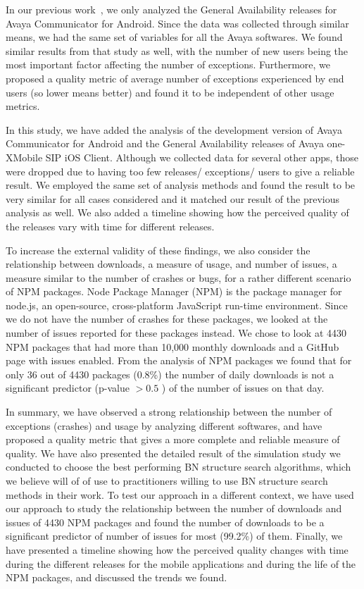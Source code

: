 \documentclass[smallextended]{svjour3}       %
\begin{document}
In our previous work~\cite{dey2018modeling}, we only analyzed the
General Availability releases for  Avaya Communicator for
Android. Since the data was collected through similar means, we had
the same set of variables for all the Avaya softwares. We found
similar results from that study as well, with the number of new
users being the most important factor affecting the number of
exceptions. 
Furthermore, we proposed a quality metric of average number of
exceptions experienced by end users (so lower means better) and
found it to be independent of other usage metrics.  

In this study, we have added the analysis of the development version 
of Avaya Communicator for Android and the
General Availability releases of Avaya one-X\textregistered  Mobile
SIP iOS Client. Although we collected data for several other apps,
those were dropped due to having too few releases/ exceptions/ users
to give a reliable result. We employed the same set of analysis
methods and found the result to be very similar for all cases
considered and it matched our result of the previous analysis as
well. We also added a timeline showing how the perceived quality of
the releases vary with time for different releases.   

To increase the external validity of these findings, we also consider
the relationship between downloads, a measure of usage, and number of 
issues, a measure similar to the number of crashes or bugs, for a rather
different scenario of NPM packages. Node Package Manager (NPM) is
the package manager for node.js, an open-source, cross-platform
JavaScript run-time environment.  Since we do not have the number of
crashes for these packages, we looked at the number of issues
reported for these packages instead. We chose to look at 4430 NPM packages
that had more than 10,000 monthly downloads and a GitHub page with issues enabled.
From the analysis of NPM packages we found that for only 36 out of
4430 packages (0.8\%) the number of daily downloads is not a
significant predictor (p-value $> 0.5$ ) of the number of issues on
that day. 

In summary, we have observed a strong relationship between the number
of exceptions (crashes) and usage by analyzing different softwares,
and have proposed a  quality metric  that gives a more
complete and reliable measure of quality.  We have also presented the
detailed result of the simulation study we conducted to choose the
best performing BN structure search algorithms, which we believe
will of of use to practitioners willing to use BN structure search
methods in their work. To test our approach in a different context, we have used our
approach to study the relationship between the number of downloads
and issues of 4430 NPM packages and found the number of downloads to be a significant
predictor of number of issues for most (99.2\%) of them. Finally, we have presented a timeline
showing how the perceived quality changes with time during the different releases for the mobile 
applications and during the life of the NPM packages, and discussed the trends we found.
\end{document}
